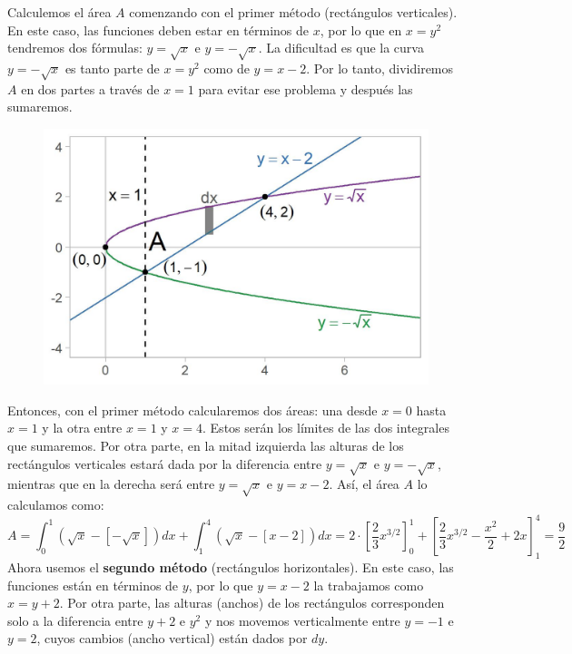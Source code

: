 \documentclass[12pt]{article}
\begin{document}
Calculemos el área $A$ comenzando con el primer método (rectángulos verticales). En este caso, las funciones deben estar en términos de $x$, por lo que en $x = y^{2}$ tendremos dos fórmulas: $y = \sqrt{x}$ e $y = -\sqrt{x}$. La dificultad es que la curva $y = -\sqrt{x}$ es tanto parte de $x = y^{2}$ como de $y = x - 2$. Por lo tanto, dividiremos $A$ en dos partes a través de $x = 1$ para evitar ese problema y después las sumaremos.

\begin{figure}[hbt!]
\centering
\includegraphics[scale=0.7]{img/example_method_1.jpg}
\end{figure}

Entonces, con el primer método calcularemos dos áreas: una desde $x = 0$ hasta $x = 1$ y la otra entre $x = 1$ y $x = 4$. Estos serán los límites de las dos integrales que sumaremos. Por otra parte, en la mitad izquierda las alturas de los rectángulos verticales estará dada por la diferencia entre $y = \sqrt{x}$ e $y = - \sqrt{x}$, mientras que en la derecha será entre $y = \sqrt{x}$ e $y = x - 2$. Así, el área $A$ lo calculamos como:
\[
  A = \int_{0}^{1} (\sqrt{x} - [-\sqrt{x}]) dx + \int_{1}^{4} (\sqrt{x} - [x - 2]) dx
    = 2 \cdot \left[\frac{2}{3}x^{3/2}\right]_{0}^{1} +
      \left[\frac{2}{3}x^{3/2} - \frac{x^{2}}{2} + 2x\right]_{1}^{4}
    = \frac{9}{2}
\]
Ahora usemos el \textbf{segundo método} (rectángulos horizontales). En este caso, las funciones están en términos de $y$, por lo que $y = x - 2$ la trabajamos como $x = y + 2$. Por otra parte, las alturas (anchos) de los rectángulos corresponden solo a la diferencia entre $y + 2$ e $y^{2}$ y nos movemos verticalmente entre $y = -1$ e $y = 2$, cuyos cambios (ancho vertical) están dados por $dy$.
\end{document}
